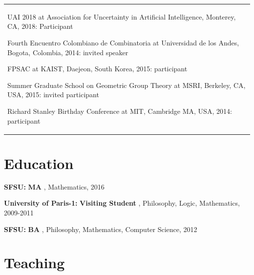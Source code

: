 \documentclass[margin,line,pifont,palatino,courier]{res}
\newenvironment{list1}{
  \begin{list}{\label{ } }{
      \setlength{\itemsep}{0in}
      \setlength{\parsep}{0in} \setlength{\parskip}{0in}
      \setlength{\topsep}{0in} \setlength{\partopsep}{0in}
      \setlength{\leftmargin}{0.0in} } }{\end{list} }
\begin{document}
\begin{resume}
\begin{tabular}{@{}p{5in}}
\begin{list1}
      
         \item  { UAI 2018 }  at Association for Uncertainty in Artificial Intelligence, Monterey, CA, 2018:  Participant
      \vspace{.2em}
      
         \item  { Fourth Encuentro Colombiano de Combinatoria }  at Universidad de los Andes, Bogota, Colombia, 2014:  invited speaker
      \vspace{.2em}
      
         \item  { FPSAC }  at KAIST, Daejeon, South Korea, 2015:  participant
      \vspace{.2em}
      
         \item  { Summer Graduate School on Geometric Group Theory }  at MSRI, Berkeley, CA, USA, 2015:  invited participant
      \vspace{.2em}
      
         \item  { Richard Stanley Birthday Conference }  at MIT, Cambridge MA, USA, 2014:  participant
      \vspace{.2em}
      
    \end{list1}
  \end{tabular}


\section{\sc Education} 
  \begin{list1}
    
    
        \item  {\bf SFSU:}\textbf{ MA }, Mathematics, 2016

          
    
        \item  {\bf University of Paris-1:}\textbf{ Visiting Student }, Philosophy, Logic, Mathematics, 2009-2011

          
    
        \item  {\bf SFSU:}\textbf{ BA }, Philosophy, Mathematics, Computer Science, 2012

          
    

  \end{list1}


\section{\sc Teaching} 
  \begin{list1}
    

\end{list1}
\end{resume}
\end{document}
